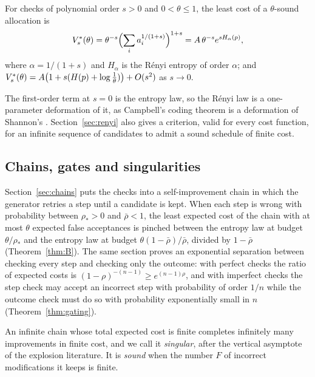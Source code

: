 \begin{mainthm}\label{thm:D}
For checks of polynomial order $s>0$ and $0<\theta\le1$, the least cost of a $\theta$-sound allocation is
\begin{equation}\label{eq:renyilaw}
V^{*}_{s}(\theta)=\theta^{-s}\Bigl(\sum_{i}a_{i}^{1/(1+s)}\Bigr)^{1+s}=A\,\theta^{-s}e^{sH_{\alpha}(p)},
\end{equation}
where $\alpha=1/(1+s)$ and $H_{\alpha}$ is the R\'enyi entropy of order $\alpha$; and $V^{*}_{s}(\theta)=A\bigl(1+s(H(p)+\log\frac1\theta)\bigr)+O(s^{2})$ as $s\to0$.
\end{mainthm}

The first-order term at $s=0$ is the entropy law, so the R\'enyi law is a one-parameter deformation of it, as Campbell's coding theorem is a deformation of Shannon's \cite{Cam65}. Section~\ref{sec:renyi} also gives a criterion, valid for every cost function, for an infinite sequence of candidates to admit a sound schedule of finite cost.

\subsection{Chains, gates and singularities}

Section~\ref{sec:chains} puts the checks into a self-improvement chain in which the generator retries a step until a candidate is kept. When each step is wrong with probability between $\rho_{\ast}>0$ and $\bar\rho<1$, the least expected cost of the chain with at most $\theta$ expected false acceptances is pinched between the entropy law at budget $\theta/\rho_{\ast}$ and the entropy law at budget $\theta(1-\bar\rho)/\bar\rho$, divided by $1-\bar\rho$ (Theorem~\ref{thm:B}). The same section proves an exponential separation between checking every step and checking only the outcome: with perfect checks the ratio of expected costs is $(1-\rho)^{-(n-1)}\ge e^{(n-1)\rho}$, and with imperfect checks the step check may accept an incorrect step with probability of order $1/n$ while the outcome check must do so with probability exponentially small in $n$ (Theorem~\ref{thm:gating}).

An infinite chain whose total expected cost is finite completes infinitely many improvements in finite cost, and we call it \emph{singular}, after the vertical asymptote of the explosion literature. It is \emph{sound} when the number $F$ of incorrect modifications it keeps is finite.

